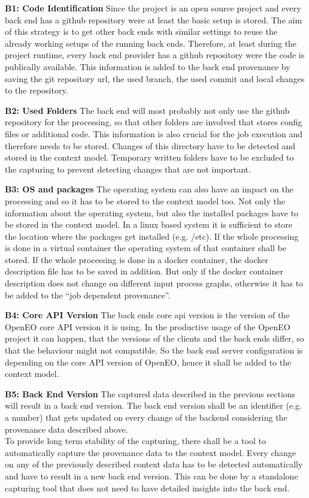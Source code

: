 \documentclass[draft,final]{vutinfth} %
\begin{document}
\textbf{B1: Code Identification}
Since the project is an open source project and every back end has a github repository were at least the basic setup is stored. The aim of this strategy is to get other back ends with similar settings to reuse the already working setups of the running back ends.  Therefore, at least during the project runtime, every back end provider has a github repository were the code is publically available. This information is added to the back end provenance by saving the git repository url, the used branch, the used commit and local changes to the repository.   

\textbf{B2: Used Folders}
The back end will most probably not only use the github repository for the processing, so that other folders are involved that stores config files or additional code. This information is also crucial for the job execution and therefore needs to be stored. Changes of this directory have to be detected and stored in the context model. Temporary written folders have to be excluded to the capturing to prevent detecting changes that are not important.    

\textbf{B3: OS and packages}
The operating system can also have an impact on the processing and so it has to be stored to the context model too. Not only the information about the operating system, but also the installed packages have to be stored in the context model. In a linux based system it is sufficient to store the location where the packages get installed (e.g. /etc). If the whole processing is done in a virtual container the operating system of that container shall be stored. If the whole processing is done in a docker container, the docker description file has to be saved in addition. But only if the docker container description does not change on different input process graphs, otherwise it has to be added to the “job dependent provenance”. 

\textbf{B4: Core API Version}
The back ends core api version is the version of the OpenEO core API version it is using. In the productive usage of the OpenEO project it can happen, that the versions of the clients and the back ends differ, so that the behaviour might not compatible. So the back end server configuration is depending on the core API version of OpenEO, hence it shall be added to the context model.

\textbf{B5: Back End Version}
The captured data described in the previous sections will result in a back end version. The back end version shall be an identifier (e.g. a number) that gets updated on every change of the backend considering the provenance data described above. 
\\
To  provide long term stability of the capturing, there shall be a tool to automatically capture the provenance data to the context model. Every change on any of the previously described context data has to be detected automatically and have to result in a new back end version. This can be done by a standalone capturing tool that does not need to have detailed insights into the back end. 
\end{document}
